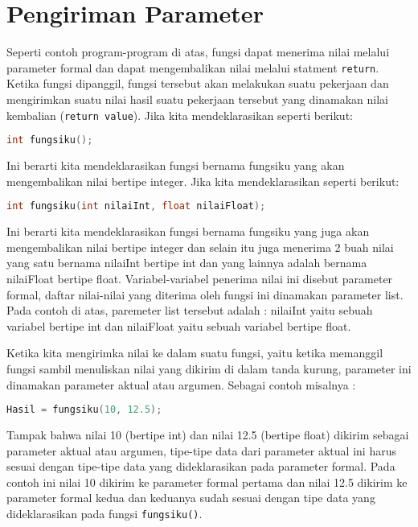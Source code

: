 \section{Pengiriman Parameter}\label{pengiriman-parameter}

Seperti contoh program-program di atas, fungsi dapat menerima nilai
melalui parameter formal dan dapat mengembalikan nilai melalui statment
\texttt{return}. Ketika fungsi dipanggil, fungsi tersebut akan melakukan
suatu pekerjaan dan mengirimkan suatu nilai hasil suatu pekerjaan
tersebut yang dinamakan nilai kembalian (\texttt{return\ value}). Jika
kita mendeklarasikan seperti berikut:

\begin{lstlisting}[language=c++, numbers=none]
int fungsiku();  
\end{lstlisting}

Ini berarti kita mendeklarasikan fungsi bernama fungsiku yang akan
mengembalikan nilai bertipe integer. Jika kita mendeklarasikan seperti
berikut:

\begin{lstlisting}[language=c++, numbers=none]
int fungsiku(int nilaiInt, float nilaiFloat);  
\end{lstlisting}

Ini berarti kita mendeklarasikan fungsi bernama fungsiku yang juga akan
mengembalikan nilai bertipe integer dan selain itu juga menerima 2 buah
nilai yang satu bernama nilaiInt bertipe int dan yang lainnya adalah
bernama nilaiFloat bertipe float. Variabel-variabel penerima nilai ini
disebut parameter formal, daftar nilai-nilai yang diterima oleh fungsi
ini dinamakan parameter list. Pada contoh di atas, paremeter list
tersebut adalah : nilaiInt yaitu sebuah variabel bertipe int dan
nilaiFloat yaitu sebuah variabel bertipe float.

Ketika kita mengirimka nilai ke dalam suatu fungsi, yaitu ketika
memanggil fungsi sambil menuliskan nilai yang dikirim di dalam tanda
kurung, parameter ini dinamakan parameter aktual atau argumen. Sebagai
contoh misalnya :

\begin{lstlisting}[language=c++, numbers=none]
Hasil = fungsiku(10, 12.5);  
\end{lstlisting}

Tampak bahwa nilai 10 (bertipe int) dan nilai 12.5 (bertipe float)
dikirim sebagai parameter aktual atau argumen, tipe-tipe data dari
parameter aktual ini harus sesuai dengan tipe-tipe data yang
dideklarasikan pada parameter formal. Pada contoh ini nilai 10 dikirim
ke parameter formal pertama dan nilai 12.5 dikirim ke parameter formal
kedua dan keduanya sudah sesuai dengan tipe data yang dideklarasikan
pada fungsi \texttt{fungsiku()}.

